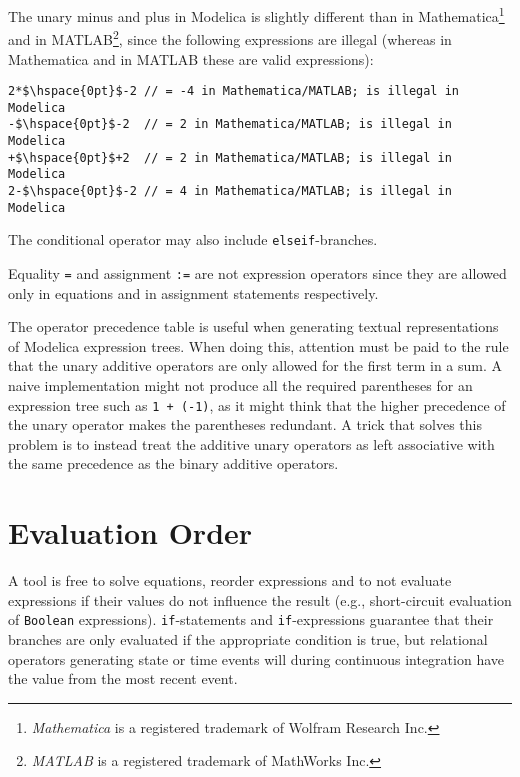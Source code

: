 \begin{example}
The unary minus and plus in Modelica is slightly different than in Mathematica\footnote{\emph{Mathematica} is a registered trademark of Wolfram Research Inc.} and in MATLAB\footnote{\emph{MATLAB} is a registered trademark of MathWorks Inc.}, since the following expressions are illegal (whereas in Mathematica and in MATLAB these are valid expressions):
\begin{lstlisting}[language=modelica]
2*$\hspace{0pt}$-2 // = -4 in Mathematica/MATLAB; is illegal in Modelica
-$\hspace{0pt}$-2  // = 2 in Mathematica/MATLAB; is illegal in Modelica
+$\hspace{0pt}$+2  // = 2 in Mathematica/MATLAB; is illegal in Modelica
2-$\hspace{0pt}$-2 // = 4 in Mathematica/MATLAB; is illegal in Modelica
\end{lstlisting}
\end{example}

The conditional operator may also include \lstinline!elseif!-branches.

Equality \lstinline!=! and assignment \lstinline!:=! are not expression operators since they are allowed only in equations and in assignment statements respectively.

\begin{nonnormative}
The operator precedence table is useful when generating textual representations of Modelica expression trees.
When doing this, attention must be paid to the rule that the unary additive operators are only allowed for the first term in a sum.
A naive implementation might not produce all the required parentheses for an expression tree such as \lstinline!1 + (-1)!, as it might think that the higher precedence of the unary operator makes the parentheses redundant.
A trick that solves this problem is to instead treat the additive unary operators as left associative with the same precedence as the binary additive operators.
\end{nonnormative}


\section{Evaluation Order}\label{evaluation-order}

A tool is free to solve equations, reorder expressions and to not evaluate expressions if their values do not influence the result (e.g., short-circuit evaluation of \lstinline!Boolean! expressions).
\lstinline!if!-statements and \lstinline!if!-expressions guarantee that their branches are only evaluated if the appropriate condition is true, but relational operators generating state or time events will during continuous integration have the value from the most recent event.

